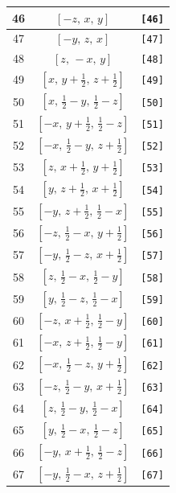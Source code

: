 \documentclass[fleqn,8pt]{jsarticle}
\begin{document}
\begin{longtable}{ccc}
46 & $\left[ - z,\, x,\, y \right]$ & {\tt [46]} \\ \hline
47 & $\left[ - y,\, z,\, x \right]$ & {\tt [47]} \\ \hline
48 & $\left[ z,\, - x,\, y \right]$ & {\tt [48]} \\ \hline
49 & $\left[ x,\, y + \frac{1}{2},\, z + \frac{1}{2} \right]$ & {\tt [49]} \\ \hline
50 & $\left[ x,\, \frac{1}{2} - y,\, \frac{1}{2} - z \right]$ & {\tt [50]} \\ \hline
51 & $\left[ - x,\, y + \frac{1}{2},\, \frac{1}{2} - z \right]$ & {\tt [51]} \\ \hline
52 & $\left[ - x,\, \frac{1}{2} - y,\, z + \frac{1}{2} \right]$ & {\tt [52]} \\ \hline
53 & $\left[ z,\, x + \frac{1}{2},\, y + \frac{1}{2} \right]$ & {\tt [53]} \\ \hline
54 & $\left[ y,\, z + \frac{1}{2},\, x + \frac{1}{2} \right]$ & {\tt [54]} \\ \hline
55 & $\left[ - y,\, z + \frac{1}{2},\, \frac{1}{2} - x \right]$ & {\tt [55]} \\ \hline
56 & $\left[ - z,\, \frac{1}{2} - x,\, y + \frac{1}{2} \right]$ & {\tt [56]} \\ \hline
57 & $\left[ - y,\, \frac{1}{2} - z,\, x + \frac{1}{2} \right]$ & {\tt [57]} \\ \hline
58 & $\left[ z,\, \frac{1}{2} - x,\, \frac{1}{2} - y \right]$ & {\tt [58]} \\ \hline
59 & $\left[ y,\, \frac{1}{2} - z,\, \frac{1}{2} - x \right]$ & {\tt [59]} \\ \hline
60 & $\left[ - z,\, x + \frac{1}{2},\, \frac{1}{2} - y \right]$ & {\tt [60]} \\ \hline
61 & $\left[ - x,\, z + \frac{1}{2},\, \frac{1}{2} - y \right]$ & {\tt [61]} \\ \hline
62 & $\left[ - x,\, \frac{1}{2} - z,\, y + \frac{1}{2} \right]$ & {\tt [62]} \\ \hline
63 & $\left[ - z,\, \frac{1}{2} - y,\, x + \frac{1}{2} \right]$ & {\tt [63]} \\ \hline
64 & $\left[ z,\, \frac{1}{2} - y,\, \frac{1}{2} - x \right]$ & {\tt [64]} \\ \hline
65 & $\left[ y,\, \frac{1}{2} - x,\, \frac{1}{2} - z \right]$ & {\tt [65]} \\ \hline
66 & $\left[ - y,\, x + \frac{1}{2},\, \frac{1}{2} - z \right]$ & {\tt [66]} \\ \hline
67 & $\left[ - y,\, \frac{1}{2} - x,\, z + \frac{1}{2} \right]$ & {\tt [67]} \\ \hline

\end{longtable}
\end{document}
